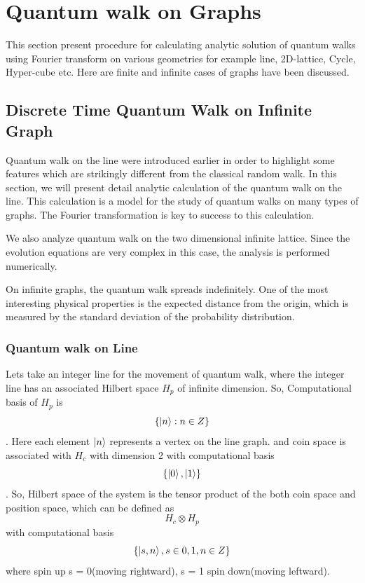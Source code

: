\documentclass[11 pt]{article}
\theoremstyle{definition}
\theoremstyle{remark}
\newcommand{\tens}[1]{
  \mathbin{\mathop{\otimes}\limits_{#1}}}
\begin{document}
\section{Quantum walk on Graphs}
This section present procedure for calculating analytic solution of quantum walks using Fourier transform on various geometries for example line, 2D-lattice, Cycle, Hyper-cube etc. Here are finite and infinite cases of graphs have been discussed.

\subsection{Discrete Time Quantum Walk on Infinite Graph}
Quantum walk on the line were introduced earlier in order to highlight some features which are strikingly different from the classical random walk. In this section, we will present detail analytic calculation of the quantum walk on the line. This calculation is a model for the study of quantum walks on many types of graphs. The Fourier transformation is key to success to this calculation.

We also analyze quantum walk on the two dimensional infinite lattice. Since the evolution equations are very complex in this case, the analysis is performed numerically.

On infinite graphs, the quantum walk spreads indefinitely. One of the most interesting physical properties is the expected distance from the origin, which is measured by the standard deviation of the probability distribution.

\subsubsection{Quantum walk on Line}
Lets take an integer line for the movement of quantum walk, where the integer line has an associated Hilbert space $H_p$ of infinite dimension. So, Computational basis of $H_p$ is $$\{\ket{n}: n \in Z\}$$.
Here each element $\ket{n}$ represents a vertex on the line graph. and coin space is associated with $H_c$ with dimension 2 with computational basis
$$\{\ket{0},\ket{1}\}$$.
So, Hilbert space of the system is the tensor product of the both coin space and position space, which can be defined as $$H_c \tens{} H_p$$
with computational basis $$\{\ket{s,n}, s \in {0,1}, n \in Z\}$$
where spin up s = 0(moving rightward), s = 1 spin down(moving leftward).
\end{document}
